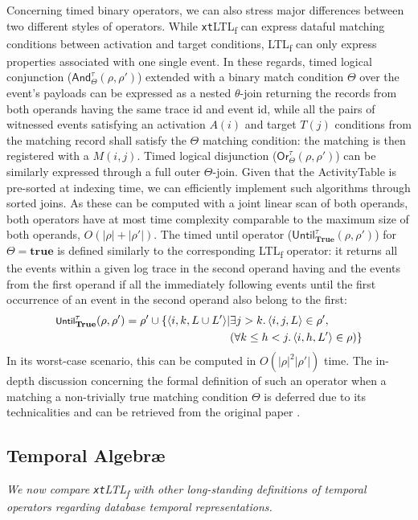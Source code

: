 \documentclass[sigconf]{acmart}
\begin{document}
Concerning timed binary operators, we can also stress major differences between two different styles of operators. While \texttt{xt}LTL\textsubscript{f} can  express dataful matching conditions between activation and target conditions,  LTL\textsubscript{f} can only express properties associated with one single event.
In these regards, timed logical conjunction ($\textsf{And}^\tau_\Theta(\rho,\rho')$) extended with a binary match condition $\Theta$ over the event's payloads can be expressed as a nested $\theta$-join returning the records from both operands having the same trace id and event id, while all the pairs of witnessed events satisfying an activation $A(i)$ and target $T(j)$ conditions from the matching record shall satisfy the $\Theta$ matching condition: the matching is then registered with a $M(i,j)$. Timed logical disjunction ($\textsf{Or}^\tau_\Theta(\rho,\rho')$) can be similarly expressed through a full outer $\Theta$-join. Given that the ActivityTable is pre-sorted at indexing time, we can efficiently implement such algorithms through sorted joins. As these can be computed with a joint linear scan of both operands, both operators have at most time complexity comparable to the maximum size of both operands, $O(|\rho|+|\rho'|)$. The timed until operator ($\textsf{Until}^\tau_{\textbf{True}}(\rho,\rho')$) for $\Theta=\textbf{true}$ is defined similarly to the corresponding LTL\textsubscript{f} operator: it returns all the events within a given log trace in the second operand having and the events from the first operand if all the immediately following events until the first occurrence of an event in the second operand also belong to the first:
		\[\begin{split}
\footnotesize 			\textsf{Until}^\tau_\textbf{True}(\rho,\rho')=\rho'\cup \{\footnotesize\langle i,k,L\cup L'\rangle |&\exists j>k. \braket{i,j,L}\in\rho', \\
&(\forall k\leq h<j. \braket{i,h,L'}\in\rho) \}
\end{split}\]
In its worst-case scenario, this can be computed in $O(|\rho|^2|\rho'|)$ time.
 The in-depth discussion concerning the formal definition of such an operator when a matching a non-trivially true matching condition $\Theta$ is deferred due to its technicalities and can be retrieved from the original paper \cite{info14030173}.
\bigskip

\subsection{Temporal Algebr\ae}\label{timecompl}
\textit{We now compare \texttt{xt}LTL\textsubscript{f} with other long-standing definitions of temporal operators regarding database temporal representations.} 
\end{document}
